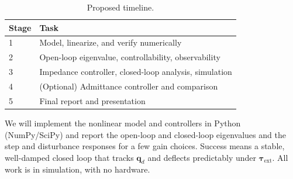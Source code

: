 \documentclass[letterpaper, 10pt, conference]{ieeeconf}
\begin{document}
\begin{table}[htbp]
\centering
\caption{Proposed timeline.}
\begin{tabular}{@{}ll@{}}
\toprule
Stage & Task \\
\midrule
1 & Model, linearize, and verify numerically \\
2 & Open-loop eigenvalue, controllability, observability \\
3 & Impedance controller, closed-loop analysis, simulation \\
4 & (Optional) Admittance controller and comparison \\
5 & Final report and presentation \\
\bottomrule
\end{tabular}
\end{table}

We will implement the nonlinear model and controllers
in Python (NumPy/SciPy) and report the open-loop and
closed-loop eigenvalues and the step and disturbance
responses for a few gain choices. Success means a
stable, well-damped closed loop that tracks
$\mathbf{q}_d$ and deflects predictably under
$\boldsymbol{\tau}_{\mathrm{ext}}$. All work is in
simulation, with no hardware.



\end{document}
